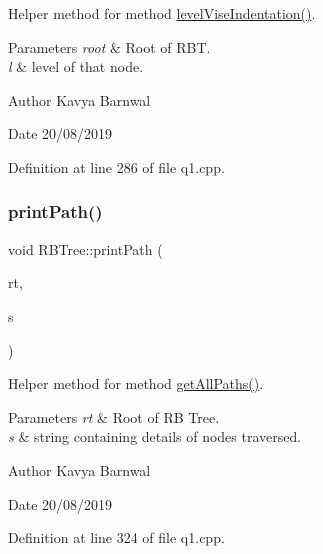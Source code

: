 Helper method for method \hyperlink{class_r_b_tree_addb32f82fc392201f9b8d6f3aaddb382}{level\+Vise\+Indentation()}. 
\begin{DoxyParams}{Parameters}
{\em root} & Root of R\+BT. \\
\hline
{\em l} & level of that node. \\
\hline
\end{DoxyParams}
\begin{DoxyAuthor}{Author}
Kavya Barnwal 
\end{DoxyAuthor}
\begin{DoxyDate}{Date}
20/08/2019 
\end{DoxyDate}


Definition at line 286 of file q1.\+cpp.

\mbox{\label{class_r_b_tree_ade103a94c3a3cd1f6a98a354d8f798d1}} 
\subsubsection{\texorpdfstring{print\+Path()}{printPath()}}
{\footnotesize\ttfamily void R\+B\+Tree\+::print\+Path (\begin{DoxyParamCaption}\item[{\hyperlink{struct_r_b_t_node}{R\+B\+T\+Node} $\ast$}]{rt,  }\item[{string}]{s }\end{DoxyParamCaption})\hspace{0.3cm}{\ttfamily [inline]}}

Helper method for method \hyperlink{class_r_b_tree_a12c03168e62443644c5043fd2ffb5f39}{get\+All\+Paths()}. 
\begin{DoxyParams}{Parameters}
{\em rt} & Root of RB Tree. \\
\hline
{\em s} & string containing details of nodes traversed. \\
\hline
\end{DoxyParams}
\begin{DoxyAuthor}{Author}
Kavya Barnwal 
\end{DoxyAuthor}
\begin{DoxyDate}{Date}
20/08/2019 
\end{DoxyDate}


Definition at line 324 of file q1.\+cpp.

\mbox{\label{class_r_b_tree_a270245764ca4bafce48daa2814841b14}} 
